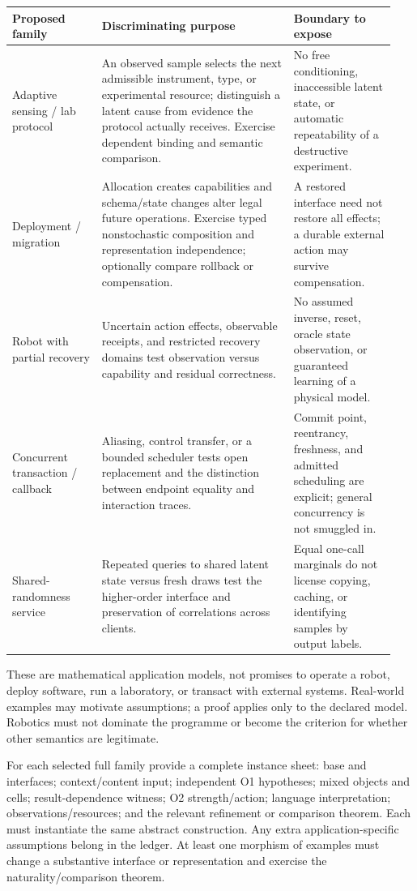 \documentclass[11pt,a4paper]{article}
\begin{document}
\begin{longtable}{@{}p{0.22\linewidth}p{0.47\linewidth}p{0.25\linewidth}@{}}
\toprule
Proposed family & Discriminating purpose & Boundary to expose \\
\midrule
\endhead
Adaptive sensing / lab protocol &
An observed sample selects the next admissible instrument, type, or
experimental resource; distinguish a latent cause from evidence the protocol
actually receives. Exercise dependent binding and semantic comparison. &
No free conditioning, inaccessible latent state, or automatic repeatability
of a destructive experiment. \\
Deployment / migration &
Allocation creates capabilities and schema/state changes alter legal future
operations. Exercise typed nonstochastic composition and representation
independence; optionally compare rollback or compensation. &
A restored interface need not restore all effects; a durable external action
may survive compensation. \\
Robot with partial recovery &
Uncertain action effects, observable receipts, and restricted recovery
domains test observation versus capability and residual correctness. &
No assumed inverse, reset, oracle state observation, or guaranteed learning
of a physical model. \\
Concurrent transaction / callback &
Aliasing, control transfer, or a bounded scheduler tests open replacement
and the distinction between endpoint equality and interaction traces. &
Commit point, reentrancy, freshness, and admitted scheduling are explicit;
general concurrency is not smuggled in. \\
Shared-randomness service &
Repeated queries to shared latent state versus fresh draws test the
higher-order interface and preservation of correlations across clients. &
Equal one-call marginals do not license copying, caching, or identifying
samples by output labels. \\
\bottomrule
\end{longtable}

These are mathematical application models, not promises to operate a robot,
deploy software, run a laboratory, or transact with external systems.
Real-world examples may motivate assumptions; a proof applies only to the
declared model. Robotics must not dominate the programme or become the
criterion for whether other semantics are legitimate.

For each selected full family provide a complete instance sheet: base and
interfaces; context/content input; independent O1 hypotheses; mixed objects
and cells; result-dependence witness; O2 strength/action; language
interpretation; observations/resources; and the relevant refinement or
comparison theorem. Each must instantiate the same abstract construction.
Any extra application-specific assumptions belong in the ledger. At least
one morphism of examples must change a substantive interface or representation
and exercise the naturality/comparison theorem.
\end{document}
